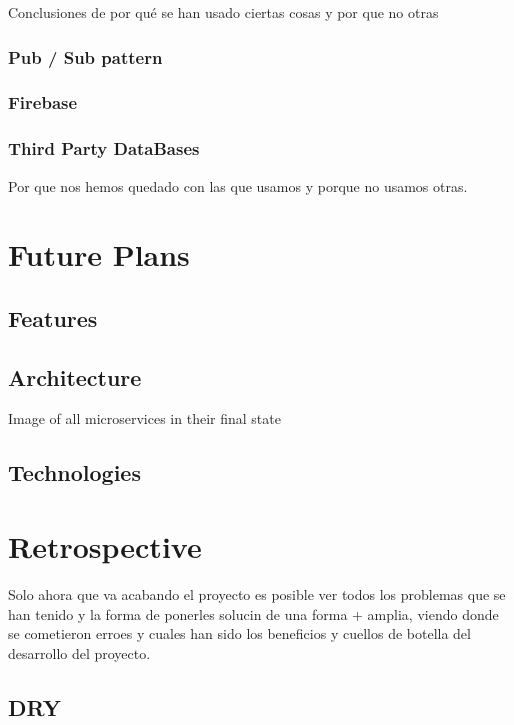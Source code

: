 \documentclass[oneside,english,titlepage]{scrbook}
\begin{document}
Conclusiones de por qué se han usado ciertas cosas y por que no otras

\subsection{Pub / Sub pattern}

\subsection{Firebase}

\subsection{Third Party DataBases}

Por que nos hemos quedado con las que usamos y porque no usamos otras.

\chapter{Future Plans}

\section{Features}

\section{Architecture}

Image of all microservices in their final state

\section{Technologies}

\chapter{Retrospective}

Solo ahora que va acabando el proyecto es posible ver todos los problemas
que se han tenido y la forma de ponerles solucin de una forma +
amplia, viendo donde se cometieron erroes y cuales han sido los beneficios
y cuellos de botella del desarrollo del proyecto.

\section{DRY}
\end{document}
